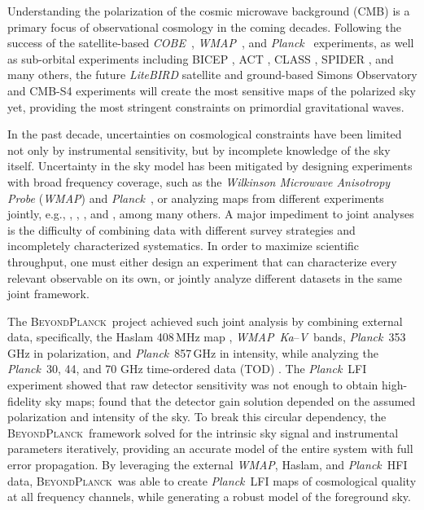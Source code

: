 \documentclass[twocolumn]{../../common/aa}
\def\WMAP{\emph{WMAP}}
\def\COBE{\emph{COBE}}
\def\Planck{\emph{Planck}}
\newcommand{\bp}{\textsc{BeyondPlanck}}
\newcommand{\Ka}[0]{\textit{Ka}}
\newcommand{\V}[0]{\textit V}
\begin{document}
Understanding the polarization of the cosmic microwave background (CMB) is a primary focus of observational cosmology in the coming decades. Following the success of the satellite-based \COBE\ \citep{smoot:1992,mather:1994,hauser:1998}, \WMAP\ \citep{bennett2012}, and \Planck\ \citep{planck2016-l01} experiments, as well as sub-orbital experiments including BICEP \citep{bicep2021}, ACT \citep{actDR6_lensing}, CLASS \citep{eimer2023}, SPIDER \citep{spider21}, and many others, the future \textit{LiteBIRD} satellite \citep{ptep} and ground-based Simons Observatory \citep{SO2019} and CMB-S4 \citep{cmbs4} experiments will create the most sensitive maps of the polarized sky yet, providing the most stringent constraints on primordial gravitational waves.

In the past decade, uncertainties on cosmological constraints have been limited not only by instrumental sensitivity, but by incomplete knowledge of the sky itself. Uncertainty in the sky model has been mitigated by designing experiments with broad frequency coverage, such as the \textit{Wilkinson Microwave Anisotropy Probe} (\WMAP) \citep{bennett2012} and \Planck\ \citep{planck2016-l01}, or analyzing maps from different experiments jointly, e.g., \citet{dmr}, \citet{bennett2012}, \citet{planck2014-a12}, and \citet{pb2015}, among many others.
A major impediment to joint analyses is the difficulty of combining data with different survey strategies and incompletely characterized systematics. In order to maximize scientific throughput, one must either design an experiment that can characterize every relevant observable on its own, or jointly analyze different datasets in the same joint framework.

The \bp\ project achieved such joint analysis by combining external data, specifically, the Haslam 408\,MHz map \citep{haslam1982}, \WMAP\ \Ka--\V\ bands, \Planck\ 353\,GHz in polarization, and \Planck\ 857\,GHz in intensity, while analyzing the \Planck\ 30, 44, and 70 GHz time-ordered data (TOD) \citep{bp01}.
The \Planck\ LFI experiment showed that raw detector sensitivity was not enough to obtain high-fidelity sky maps; \citet{planck2016-l02} found that the detector gain solution depended on the assumed polarization and intensity of the sky. To break this circular dependency, the \bp\ framework solved for the intrinsic sky signal and instrumental parameters iteratively, providing an accurate model of the entire system with full error propagation. By leveraging the external \WMAP, Haslam, and \Planck\ HFI  data, \bp\ was able to create \Planck\ LFI maps of cosmological quality at all frequency channels, while generating a robust model of the foreground sky.
\end{document}
